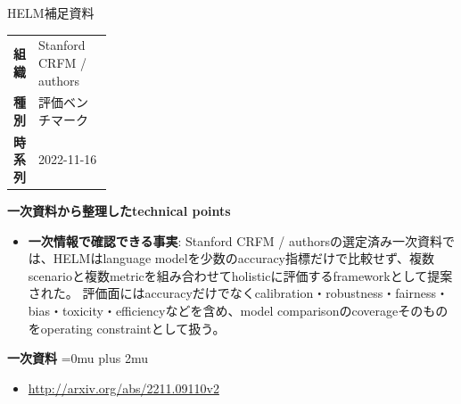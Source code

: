 \begin{technicalnote}{HELM}{補足資料}
\begingroup
\begin{tabularx}{\linewidth}{@{}>{\bfseries}p{0.22\linewidth}X@{}}
組織 & Stanford CRFM / authors \\
種別 & 評価ベンチマーク \\
時系列 & 2022-11-16 \\
\end{tabularx}
\smallskip
{\bfseries 一次資料から整理したtechnical points}
\begin{itemize}[leftmargin=1.5em,itemsep=0.35em]
\item \textbf{一次情報で確認できる事実}: Stanford CRFM / authorsの選定済み一次資料では、HELMはlanguage modelを少数のaccuracy指標だけで比較せず、複数scenarioと複数metricを組み合わせてholisticに評価するframeworkとして提案された。 評価面にはaccuracyだけでなくcalibration・robustness・fairness・bias・toxicity・efficiencyなどを含め、model comparisonのcoverageそのものをoperating constraintとして扱う。
\end{itemize}
\begin{minipage}{\linewidth}
\begin{samepage}
{\bfseries 一次資料}
\begingroup\sloppy
\Urlmuskip=0mu plus 2mu\relax
\begin{itemize}[leftmargin=1.5em,itemsep=0.25em]
\item {\scriptsize\url{http://arxiv.org/abs/2211.09110v2}}
\end{itemize}
\endgroup
\end{samepage}
\end{minipage}
\endgroup
\end{technicalnote}
\medskip
